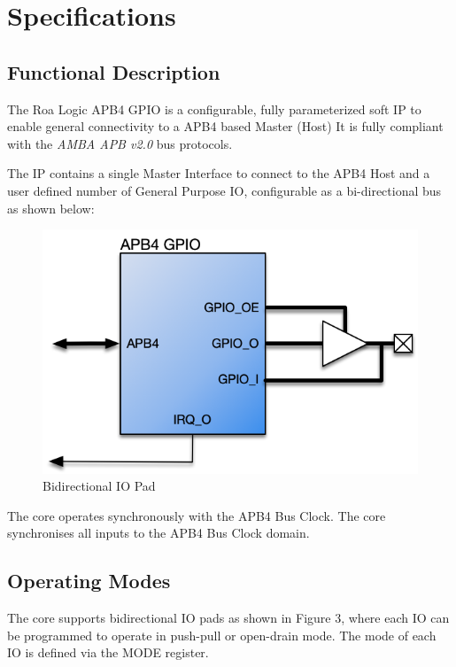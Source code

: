 \chapter{Specifications} \label{specifications}

\section{Functional Description}\label{functional-description}

The Roa Logic APB4 GPIO is a configurable, fully parameterized soft IP to
enable general connectivity to a APB4 based Master (Host) It is fully
compliant with the \emph{AMBA APB v2.0} bus protocols.

The IP contains a single Master Interface to connect to the APB4 Host
and a user defined number of General Purpose IO, configurable as a
bi-directional bus as shown below:

\begin{figure}[tbh]
	\centering
	\includegraphics{assets/img/apb4-gpio-sys.png}
	\caption{Bidirectional IO Pad}
	\label{fig:apb4-gpio-sys}
\end{figure}

The core operates synchronously with the APB4 Bus Clock. The core synchronises all inputs to the APB4 Bus Clock domain.

\section{Operating Modes}\label{operating-modes}

The core supports bidirectional IO pads as shown in Figure 3, where each
IO can be programmed to operate in push-pull or open-drain mode. The mode of each IO is
defined via the MODE register.

